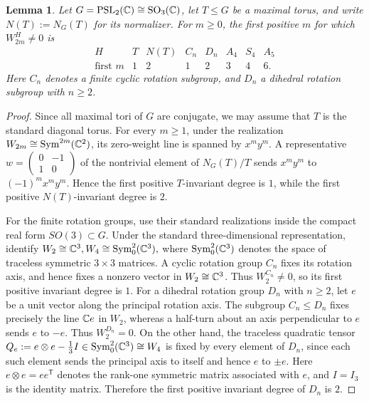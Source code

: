 \documentclass[10pt,a4paper]{amsart}
\numberwithin{equation}{section} \newtheorem{thm}{Theorem}[section] \newtheorem{lem}[thm]{Lemma} \newtheorem{ex}[thm]{Example} \newtheorem{prop}[thm]{Proposition} \newtheorem{cor}[thm]{Corollary} \newtheorem{defi}[thm]{Definition} \newtheorem{rmk}[thm]{Remark} \newtheorem{notation}[thm]{Notation}
\newcommand{\Sym}{\operatorname{Sym}}
\newcommand{\SO}{\operatorname{SO}}
\newcommand{\PSLtwo}{\operatorname{PSL}_2(\C)}
\begin{document}
\begin{lem}\label{lem:first-invariant-degrees}
Let $G=\PSLtwo\cong\SO_3(\C)$, let $T\le G$ be a maximal torus, and write \(N(T):=N_G(T)\) for its normalizer. For $m\ge0$, the first positive $m$ for which $W_{2m}^H\ne0$ is
\[
\begin{array}{c|ccccccc}
H&T&N(T)&C_n&D_n&A_4&S_4&A_5\\ \hline
\text{first }m&1&2&1&2&3&4&6.
\end{array}
\]
Here $C_n$ denotes a finite cyclic rotation subgroup, and $D_n$ a dihedral rotation subgroup with $n\ge2$.
\end{lem}

\begin{proof}
Since all maximal tori of $G$ are conjugate, we may assume that $T$ is the standard diagonal torus. For every $m\ge1$, under the realization $W_{2m}\cong\Sym^{2m}(\C^2)$, its zero-weight line is spanned by $x^my^m$. A representative $w=\begin{pmatrix}0&-1\\1&0\end{pmatrix}$ of the nontrivial element of $N_G(T)/T$ sends $x^my^m$ to $(-1)^m x^my^m$. Hence the first positive $T$-invariant degree is $1$, while the first positive $N(T)$-invariant degree is $2$.

For the finite rotation groups, use their standard realizations inside the compact real form \(SO(3)\subset G\). Under the standard three-dimensional representation, identify \(W_2\cong\C^3,W_4\cong\Sym^2_0(\C^3),\) where \(\Sym^2_0(\C^3)\) denotes the space of traceless symmetric \(3\times3\) matrices. A cyclic rotation group \(C_n\) fixes its rotation axis, and hence fixes a nonzero vector in \(W_2\cong\mathbb{C}^3\). Thus \(W_2^{C_n}\ne0\), so its first positive invariant degree is \(1\). For a dihedral rotation group $D_n$ with $n\ge2$, let $e$ be a unit vector along the principal rotation axis. The subgroup $C_n\le D_n$ fixes precisely the line $\mathbb{C} e$ in $W_2$, whereas a half-turn about an axis perpendicular to $e$ sends $e$ to $-e$. Thus $W_2^{D_n}=0$. On the other hand, the traceless quadratic tensor \(Q_e:=e\otimes e-\frac13 I\in\Sym^2_0(\C^3)\cong W_4\) is fixed by every element of $D_n$, since each such element sends the principal axis to itself and hence $e$ to $\pm e$. Here \(e\otimes e=ee^{\mathsf T}\) denotes the rank-one symmetric matrix associated with \(e\), and \(I=I_3\) is the identity matrix. Therefore the first positive invariant degree of $D_n$ is $2$.


\end{proof}
\end{document}
